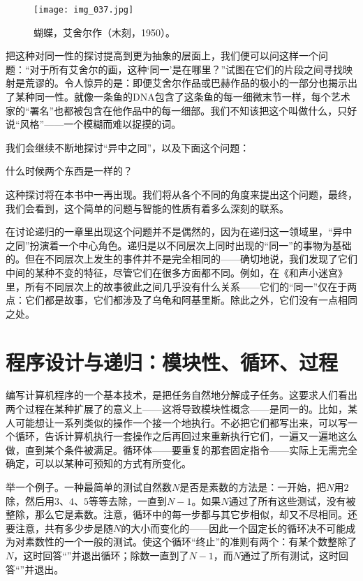 \begin{figure}
\texttt{[image: img\_037.jpg]}
\caption[蝴蝶，艾舍尔作。]
  {蝴蝶，艾舍尔作（木刻，1950）。}
\end{figure}

把这种对同一性的探讨提高到更为抽象的层面上，我们便可以问这样一个问题：“对于所有艾舍尔的画，这种‘同一’是在哪里？”试图在它们的片段之间寻找映射是荒谬的。令人惊异的是：即便艾舍尔作品或巴赫作品的极小的一部分也揭示出了某种同一性。就像一条鱼的DNA包含了这条鱼的每一细微末节一样，每个艺术家的“署名”也都被包含在他作品中的每一细部。我们不知该把这个叫做什么，只好说“风格”——一个模糊而难以捉摸的词。

我们会继续不断地探讨“异中之同”，以及下面这个问题：

\begin{block}
什么时候两个东西是一样的？
\end{block}
这种探讨将在本书中一再出现。我们将从各个不同的角度来提出这个问题，最终，我们会看到，这个简单的问题与智能的性质有着多么深刻的联系。

在讨论递归的一章里出现这个问题并不是偶然的，因为在递归这一领域里，“异中之同”扮演着一个中心角色。递归是以不同层次上同时出现的“同一”的事物为基础的。但在不同层次上发生的事件并不是完全相同的——确切地说，我们发现了它们中间的某种不变的特征，尽管它们在很多方面都不同。例如，在《和声小迷宫》里，所有不同层次上的故事彼此之间几乎没有什么关系——它们的“同一”仅在于两点：它们都是故事，它们都涉及了乌龟和阿基里斯。除此之外，它们没有一点相同之处。

\section{程序设计与递归：模块性、循环、过程}

编写计算机程序的一个基本技术，是把任务自然地分解成子任务。这要求人们看出两个过程在某种扩展了的意义上——这将导致模块性概念——是同一的。比如，某人可能想让一系列类似的操作一个接一个地执行。不必把它们都写出来，可以写一个循环，告诉计算机执行一套操作之后再回过来重新执行它们，一遍又一遍地这么做，直到某个条件被满足。循环体——要重复的那套固定指令——实际上无需完全确定，可以以某种可预知的方式有所变化。

举一个例子。一种最简单的测试自然数$N$是否是素数的方法是：一开始，把$N$用$2$除，然后用$3$、$4$、$5$等等去除，一直到$N-1$。如果$N$通过了所有这些测试，没有被整除，那么它是素数。注意，循环中的每一步都与其它步相似，却又不尽相同。还要注意，共有多少步是随$N$的大小而变化的——因此一个固定长的循环决不可能成为对素数性的一个一般的测试。使这个循环“终止”的准则有两个：有某个数整除了$N$，这时回答“”并退出循环；除数一直到了$N-1$，而$N$通过了所有测试，这时回答“”并退出。

